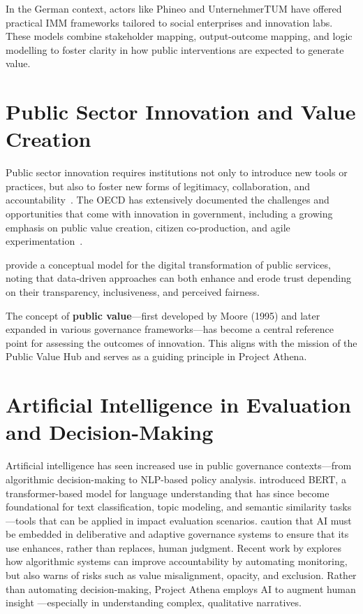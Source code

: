 In the German context, actors like Phineo and UnternehmerTUM have offered practical IMM frameworks tailored to social enterprises and innovation labs.
These models combine stakeholder mapping, output-outcome mapping, and logic modelling to foster clarity in how public interventions are expected to generate value.

\section{Public Sector Innovation and Value Creation}\label{sec:public-sector-innovation-and-value-creation}

Public sector innovation requires institutions not only to introduce new tools or practices, but also to foster new forms of legitimacy, collaboration, and accountability~\parencite{sun2019algorithmic}.
The OECD has extensively documented the challenges and opportunities that come with innovation in government, including a growing emphasis on public value creation, citizen co-production, and agile experimentation~\parencite{oecd2020publicsector}.

\textcite{wirtz2020public} provide a conceptual model for the digital transformation of public services, noting that data-driven approaches can both enhance and erode trust depending on their transparency, inclusiveness, and perceived fairness.

The concept of \textbf{public value}—first developed by Moore (1995) and later expanded in various governance frameworks—has become a central reference point for assessing the outcomes of innovation.
This aligns with the mission of the Public Value Hub and serves as a guiding principle in Project Athena.

\section{Artificial Intelligence in Evaluation and Decision-Making}\label{sec:artificial-intelligence-in-evaluation-and-decision-making}

Artificial intelligence has seen increased use in public governance contexts—from algorithmic decision-making to NLP-based policy analysis.
\textcite{devlin2018bert} introduced BERT, a transformer-based model for language understanding that has since become foundational for text classification, topic modeling, and semantic similarity tasks—tools that can be applied in impact evaluation scenarios.
\textcite{sun2019algorithmic} caution that AI must be embedded in deliberative and adaptive governance systems to ensure that its use enhances, rather than replaces, human judgment.
Recent work by \textcite{brown2020algorithmic} explores how algorithmic systems can improve accountability by automating monitoring, but also warns of risks such as value misalignment, opacity, and exclusion.
Rather than automating decision-making, Project Athena employs AI to augment human insight —especially in understanding complex, qualitative narratives.

